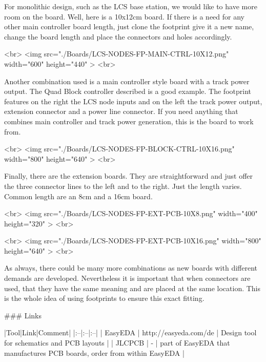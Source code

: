 For monolithic design, such as the LCS base station, we would like to have more room on the board. Well, here is a 10x12cm board. If there is a need for any other main controller board length, just clone the footprint give it a new name, change the board length and place the connectors and holes accordingly.

<br>
<img src="./Boards/LCS-NODES-FP-MAIN-CTRL-10X12.png" width="600" height="440" >
<br>

Another combination used is a main controller style board with a track power output. The Quad Block controller described is a good example. The footprint features on the right the LCS node inputs and on the left the track power output, extension connector and a power line connector. If you need anything that combines main controller and track power generation, this is the board to work from.

<br>
<img src="./Boards/LCS-NODES-FP-BLOCK-CTRL-10X16.png" width="800" height="640" >
<br>

Finally, there are the extension boards. They are straightforward and just offer the three connector lines to the left and to the right. Just the length varies. Common length are an 8cm and a 16cm board.

<br>
<img src="./Boards/LCS-NODES-FP-EXT-PCB-10X8.png" width="400" height="320" >
<br>

<br>
<img src="./Boards/LCS-NODES-FP-EXT-PCB-10X16.png" width="800" height="640" >
<br>

As always, there could be many more combinations as new boards with different demands are developed. Nevertheless it is important that when connectors are used, that they have the same meaning and are placed at the same location. This is the whole idea of using footprints to ensure this exact fitting.

### Links

|Tool|Link|Comment|
|:--|:--|:--|
| EasyEDA | http://easyeda.com/de | Design tool for schematics and PCB layouts |
| JLCPCB | - | part of EasyEDA that manufactures PCB boards, order from within EasyEDA |
